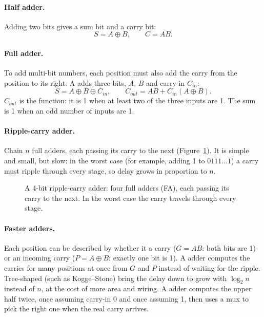 \paragraph{Half adder.} Adding two bits gives a sum bit and a carry bit:
\[
  S = A \oplus B, \qquad C = AB.
\]

\paragraph{Full adder.} To add multi-bit numbers, each position must also add the carry from the position to its right. A  adds three bits, $A$, $B$ and carry-in $C_{in}$:
\[
  S = A \oplus B \oplus C_{in}, \qquad C_{out} = AB + C_{in}(A \oplus B).
\]
$C_{out}$ is the  function: it is 1 when at least two of the three inputs are 1. The sum is 1 when an odd number of inputs are 1.

\paragraph{Ripple-carry adder.} Chain $n$ full adders, each passing its carry to the next (Figure~\ref{fig:ripple}). It is simple and small, but slow: in the worst case (for example, adding 1 to $0111\ldots1$) a carry must ripple through every stage, so delay grows in proportion to $n$.

\begin{figure}[h]
\centering
{}
\caption{A 4-bit ripple-carry adder: four full adders (FA), each passing its carry to the next. In the worst case the carry travels through every stage.}
\label{fig:ripple}
\end{figure}

\paragraph{Faster adders.} Each position can be described by whether it  a carry ($G = AB$: both bits are 1) or  an incoming carry ($P = A \oplus B$: exactly one bit is 1). A  adder computes the carries for many positions at once from $G$ and $P$ instead of waiting for the ripple. Tree-shaped  (such as Kogge--Stone) bring the delay down to grow with $\log_2 n$ instead of $n$, at the cost of more area and wiring. A  adder computes the upper half twice, once assuming carry-in 0 and once assuming 1, then uses a mux to pick the right one when the real carry arrives.

